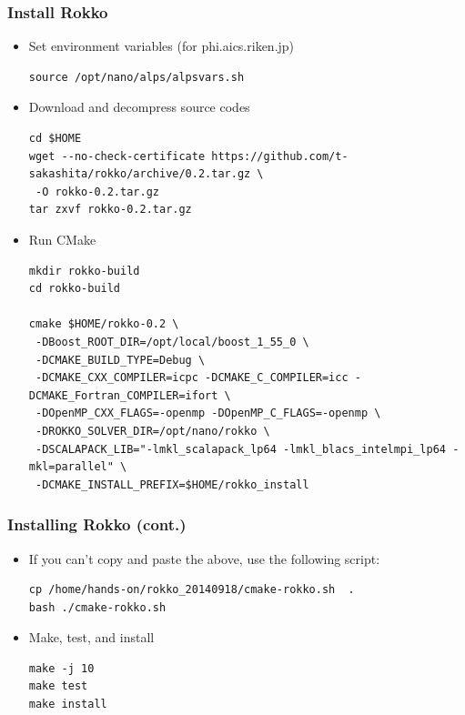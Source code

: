 \begin{frame}[c,fragile]
  \frametitle{Install Rokko}
  \begin{itemize}
  \item Set environment variables (for phi.aics.riken.jp)
\begin{lstlisting}[style=shstyle]
source /opt/nano/alps/alpsvars.sh
\end{lstlisting}
  \item Download and decompress source codes
\begin{lstlisting}[style=shstyle]
cd $HOME
wget --no-check-certificate https://github.com/t-sakashita/rokko/archive/0.2.tar.gz \
 -O rokko-0.2.tar.gz
tar zxvf rokko-0.2.tar.gz
\end{lstlisting}
  \item Run CMake
\begin{lstlisting}[style=shstyle]
mkdir rokko-build
cd rokko-build

cmake $HOME/rokko-0.2 \
 -DBoost_ROOT_DIR=/opt/local/boost_1_55_0 \
 -DCMAKE_BUILD_TYPE=Debug \
 -DCMAKE_CXX_COMPILER=icpc -DCMAKE_C_COMPILER=icc -DCMAKE_Fortran_COMPILER=ifort \
 -DOpenMP_CXX_FLAGS=-openmp -DOpenMP_C_FLAGS=-openmp \
 -DROKKO_SOLVER_DIR=/opt/nano/rokko \
 -DSCALAPACK_LIB="-lmkl_scalapack_lp64 -lmkl_blacs_intelmpi_lp64 -mkl=parallel" \
 -DCMAKE_INSTALL_PREFIX=$HOME/rokko_install
\end{lstlisting}
  \end{itemize}
\end{frame}

\begin{frame}[c,fragile]
  \frametitle{Installing Rokko (cont.)}
  \begin{itemize}
  \item If you can't copy and paste the above, use the following script:
\begin{lstlisting}[style=shstyle]
cp /home/hands-on/rokko_20140918/cmake-rokko.sh  .
bash ./cmake-rokko.sh
\end{lstlisting}
  \item Make, test, and install
\begin{lstlisting}[style=shstyle]
make -j 10
make test
make install
\end{lstlisting}
  \end{itemize}
\end{frame}

